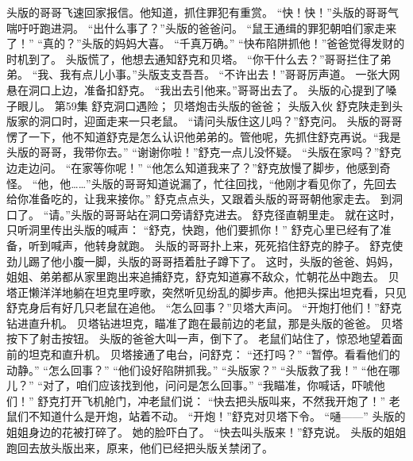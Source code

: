 \documentclass[a4paper,12pt,UTF8,twoside]{ctexbook}
\begin{document}
        头版的哥哥飞速回家报信。他知道，抓住罪犯有重赏。 
        “快！快！”头版的哥哥气喘吁吁跑进洞。 
        “出什么事了？”头版的爸爸问。 
        “鼠王通缉的罪犯朝咱们家走来了！” 
        “真的？”头版的妈妈大喜。 
        “千真万确。” 
        “快布陷阱抓他！”爸爸觉得发财的时机到了。 
        头版慌了，他想去通知舒克和贝塔。 
        “你干什么去？”哥哥拦住了弟弟。 
        “我、我有点儿小事。”头版支支吾吾。 
        “不许出去！”哥哥厉声道。 
        一张大网悬在洞口上边，准备扣舒克。 
        “我出去引他来。”哥哥出去了。 
        头版的心提到了嗓子眼儿。   第59集 
        舒克洞口遇险； 
        贝塔炮击头版的爸爸； 
        头版入伙   
        舒克陕走到头版家的洞口时，迎面走来一只老鼠。 
        “请问头版住这儿吗？”舒克问。 
        头版的哥哥愣了一下，他不知道舒克是怎么认识他弟弟的。管他呢，先抓住舒克再说。“我是头版的哥哥，我带你去。” 
        “谢谢你啦！”舒克一点儿没怀疑。 
        “头版在家吗？”舒克边走边问。 
        “在家等你呢！” 
        “他怎么知道我来了？”舒克放慢了脚步，他感到奇怪。 
        “他，他……”头版的哥哥知道说漏了，忙往回找，“他刚才看见你了，先回去给你准备吃的，让我来接你。” 
        舒克点点头，又跟着头版的哥哥朝他家走去。 
        到洞口了。 
        “请。”头版的哥哥站在洞口旁请舒克进去。 
        舒克径直朝里走。 
        就在这时，只听洞里传出头版的喊声： 
        “舒克，快跑，他们要抓你！” 
        舒克心里已经有了准备，听到喊声，他转身就跑。 
        头版的哥哥扑上来，死死掐住舒克的脖子。 
        舒克使劲儿踢了他小腹一脚，头版的哥哥捂着肚子蹲下了。 
        这时，头版的爸爸、妈妈，姐姐、弟弟都从家里跑出来追捕舒克，舒克知道寡不敌众，忙朝花丛中跑去。 
        贝塔正懒洋洋地躺在坦克里哼歌，突然听见纷乱的脚步声。他把头探出坦克看，只见舒克身后有好几只老鼠在追他。 
        “怎么回事？”贝塔大声问。 
        “开炮打他们！”舒克钻进直升机。 
        贝塔钻进坦克，瞄准了跑在最前边的老鼠，那是头版的爸爸。 
        贝塔按下了射击按钮。 
        头版的爸爸大叫一声，倒下了。 
        老鼠们站住了，惊恐地望着面前的坦克和直升机。 
        贝塔接通了电台，问舒克： 
        “还打吗？” 
        “暂停。看看他们的动静。” 
        “怎么回事？” 
        “他们设好陷阱抓我。” 
        “头版家？” 
        “头版救了我！” 
        “他在哪儿？” 
        “对了，咱们应该找到他，问问是怎么回事。” 
        “我瞄准，你喊话，吓唬他们！” 
        舒克打开飞机舱门，冲老鼠们说： 
        “快去把头版叫来，不然我开炮了！” 
        老鼠们不知道什么是开炮，站着不动。 
        “开炮！”舒克对贝塔下令。 
        “嗵——” 
        头版的姐姐身边的花被打碎了。 
        她的脸吓白了。 
        “快去叫头版来！”舒克说。 
        头版的姐姐跑回去放头版出来，原来，他们已经把头版关禁闭了。 
\end{document}
